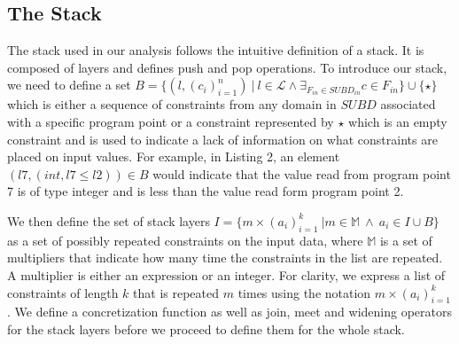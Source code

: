 \documentclass[10pt]{report}
\begin{document}
\subsection{The Stack} \label{stack}

The stack used in our analysis follows the intuitive definition of a stack. It is composed of layers and defines push and pop operations. To introduce our stack, we need to define a set $B = \lbrace (l, (c_{i})_{i=1}^{n})\ \vert \ l \in \mathcal{L} \wedge \exists_{F_{in} \in SUBD_{in}} c \in F_{in} \rbrace \cup \lbrace \star \rbrace$ which is either a sequence of constraints from any domain in $SUBD$ associated with a specific program point or a constraint represented by $ \star $ which is an empty constraint and is used to indicate a lack of information on what constraints are placed on input values. For example, in Listing 2, an element $(l7, (int, l7 \leq l2)) \in B$ would indicate that the value read from program point 7 is of type integer and is less than the value read form program point 2.

We then define the set of stack layers $I  = \lbrace  m \times (a_{i})_{i=1}^{k}\ \vert m \in \mathbb{M}\ \wedge \ a_{i} \in I \cup B \rbrace$ as a set of possibly repeated constraints on the input data, where $ \mathbb{M} $ is a set of multipliers that indicate how many time the constraints in the list are repeated. A multiplier is either an expression or an integer. For clarity, we express a list of constraints of length $ k $ that is repeated $ m $ times using the notation $ m \times (a_{i})_{i=1}^{k} $. We define a concretization function as well as join, meet and widening operators for the stack layers before we proceed to define them for the whole stack. 
\end{document}
